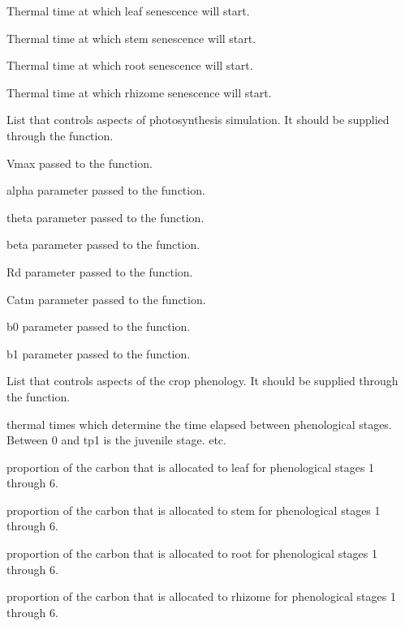 \documentclass[letterpaper]{book}
\begin{document}
\begin{Arguments}
\begin{ldescription}
 Thermal time at which leaf senescence will
start.

 Thermal time at which stem senescence will
start.

 Thermal time at which root senescence will
start.

 Thermal time at which rhizome
senescence will start.

\item[\code{photoControl}] List that controls aspects of
photosynthesis simulation. It should be supplied through
the  function.

 Vmax passed to the 
function.

 alpha parameter passed to the
 function.

 theta parameter passed to the
 function.

 beta parameter passed to the
 function.

 Rd parameter passed to the
 function.

 Catm parameter passed to the
 function.

 b0 parameter passed to the
 function.

 b1 parameter passed to the
 function.

\item[\code{phenoControl}] List that controls aspects of the
crop phenology. It should be supplied through the
 function.

 thermal times which determine the time
elapsed between phenological stages. Between 0 and tp1 is
the juvenile stage. etc.

 proportion of the carbon that is
allocated to leaf for phenological stages 1 through 6.

 proportion of the carbon that is
allocated to stem for phenological stages 1 through 6.

 proportion of the carbon that is
allocated to root for phenological stages 1 through 6.

 proportion of the carbon that is
allocated to rhizome for phenological stages 1 through 6.


\end{ldescription}
\end{Arguments}
\end{document}
